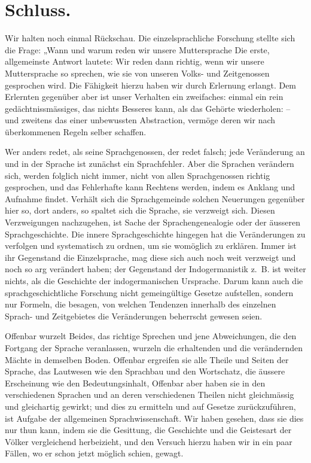 \section*{Schluss.}

Wir halten noch einmal Rückschau. Die einzelsprachliche Forschung stellte sich die Frage: „Wann und warum reden wir unsere Muttersprache  Die erste, allgemeinste Antwort lautete: Wir reden dann richtig, wenn wir unsere Muttersprache so sprechen, wie sie von unseren Volks- und Zeitgenossen gesprochen wird. Die Fähigkeit hierzu haben wir durch Erlernung erlangt. Dem Erlernten gegenüber aber ist unser Verhalten ein zweifaches: einmal ein rein gedächtnissmässiges, das nichts Besseres kann, als das Gehörte wiederholen: – und zweitens das einer unbewussten Abstraction, vermöge deren wir nach überkommenen Regeln selber schaffen.

Wer anders redet, als seine Sprachgenossen, der redet falsch; jede Veränderung an und in der Sprache ist zunächst ein Sprachfehler. Aber die Sprachen verändern sich, werden folglich nicht immer, nicht von allen Sprachgenossen richtig gesprochen, und das Fehlerhafte kann Rechtens werden, indem es Anklang und Aufnahme findet. Verhält sich die Sprachgemeinde solchen Neuerungen gegenüber hier so, dort anders, so spaltet sich die Sprache, sie verzweigt sich. Diesen Verzweigungen nachzugehen, ist Sache der Sprachengenealogie oder der äusseren Sprachgeschichte. Die innere Sprachgeschichte hingegen hat die Veränderungen zu verfolgen und systematisch zu ordnen, um sie womöglich zu erklären. Immer ist ihr Gegenstand die Einzelsprache, mag diese sich auch noch  weit verzweigt und noch so arg verändert haben; der Gegenstand der Indogermanistik z.~B. ist weiter nichts, als die Geschichte der indogermanischen Ursprache. Darum kann auch die sprachgeschichtliche Forschung  nicht gemeingültige Gesetze aufstellen, sondern nur Formeln, die besagen, von welchen Tendenzen innerhalb des einzelnen Sprach- und Zeitgebietes die Veränderungen beherrscht gewesen seien.


Offenbar wurzelt Beides, das richtige Sprechen und jene Abweichungen, die den Fortgang der Sprache veranlassen, wurzeln die erhaltenden und die verändernden Mächte in demselben Boden. Offenbar ergreifen sie alle Theile und Seiten der Sprache, das Lautwesen wie den Sprachbau und \label{fp.466} den Wortschatz, die äussere Erscheinung wie den Bedeutungsinhalt, Offenbar aber haben sie in den verschiedenen Sprachen und an deren verschiedenen Theilen nicht gleichmässig und gleichartig gewirkt; und dies zu ermitteln und auf Gesetze zurückzuführen, ist Aufgabe der allgemeinen Sprachwissenschaft. Wir haben gesehen, dass sie \label{sp.486} dies nur thun kann, indem sie die Gesittung, die Geschichte und die Geistesart der Völker vergleichend herbeizieht, und den Versuch hierzu haben wir in ein paar Fällen, wo er schon jetzt möglich schien, gewagt.

